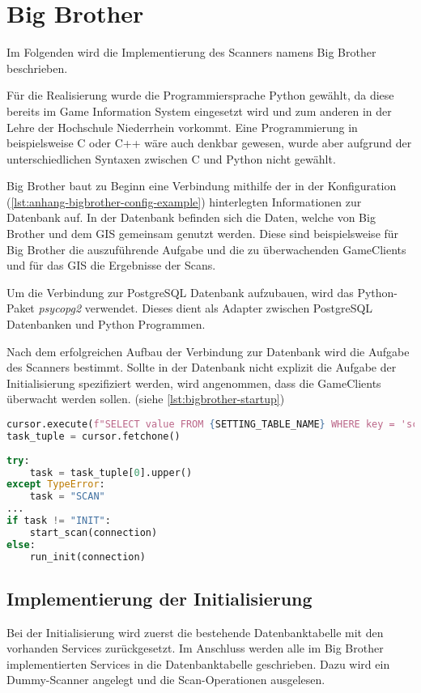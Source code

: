 \section{Big Brother}

Im Folgenden wird die Implementierung des Scanners namens Big Brother beschrieben.

Für die Realisierung wurde die Programmiersprache Python gewählt, da diese bereits im Game Information System eingesetzt wird und zum anderen in der Lehre der Hochschule Niederrhein vorkommt. Eine Programmierung in beispielsweise C oder C++ wäre auch denkbar gewesen, wurde aber aufgrund der unterschiedlichen Syntaxen zwischen C und Python nicht gewählt.

Big Brother baut zu Beginn eine Verbindung mithilfe der in der Konfiguration (\autoref{lst:anhang-bigbrother-config-example}) hinterlegten Informationen zur Datenbank auf. In der Datenbank befinden sich die Daten, welche von Big Brother und dem GIS gemeinsam genutzt werden. Diese sind beispielsweise für Big Brother die auszuführende Aufgabe und die zu überwachenden GameClients und für das GIS die Ergebnisse der Scans.

Um die Verbindung zur PostgreSQL Datenbank aufzubauen, wird das Python-Paket \textit{psycopg2} verwendet. Dieses dient als Adapter zwischen PostgreSQL Datenbanken und Python Programmen. 

Nach dem erfolgreichen Aufbau der Verbindung zur Datenbank wird die Aufgabe des Scanners bestimmt. Sollte in der Datenbank nicht explizit die Aufgabe der Initialisierung spezifiziert werden, wird angenommen, dass die GameClients überwacht werden sollen. (siehe \ref{lst:bigbrother-startup})

\begin{lstlisting}[language=Python, frame=single, caption={Aufgabe des Scanners}, captionpos=b, label={lst:bigbrother-startup}]
cursor.execute(f"SELECT value FROM {SETTING_TABLE_NAME} WHERE key = 'scanner.task'")
task_tuple = cursor.fetchone()
	
try:
	task = task_tuple[0].upper()
except TypeError:
	task = "SCAN"
...
if task != "INIT":
	start_scan(connection)
else:
	run_init(connection)	
\end{lstlisting}


\subsection{Implementierung der Initialisierung}

Bei der Initialisierung wird zuerst die bestehende Datenbanktabelle mit den vorhanden Services zurückgesetzt.
Im Anschluss werden alle im Big Brother implementierten Services in die Datenbanktabelle geschrieben. Dazu wird ein Dummy-Scanner angelegt und die Scan-Operationen ausgelesen.

